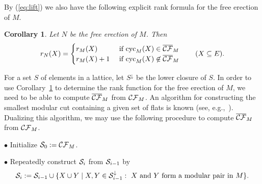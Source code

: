 \documentclass{daj}
\newtheorem{corollary}[thm]{Corollary}\theoremstyle{plain}
\begin{document}
By (\ref{eq:lift}) we also have the following explicit rank formula for the free erection of $M$.
\begin{corollary} \label{cor:free_erection}
Let $N$ be the free erection of $M$.
Then
\begin{equation}
 \label{eq:erection}
r_N(X)=\begin{cases}
r_M(X) & \mbox{ if ${\rm cyc}_M(X)\in \overline{{\cal CF}}_M$} \\
r_M(X)+1 & \mbox{ if ${\rm cyc}_M(X)\not \in \overline{{\cal CF}}_M$}
\end{cases}
\qquad (X\subseteq E).
\end{equation}
\end{corollary}

For a set $S$ of elements in a lattice, let  $S^{\downarrow}$ be the lower closure of $S$.
In order to use Corollary~\ref{cor:free_erection} to determine the rank function for the free erection of $M$, we need to be able to compute $\overline{{\cal CF}}_M$ from ${\cal CF}_M$.
An  algorithm for constructing  the smallest modular cut containing a given set of flats is known (see, e.g.,~\cite[page 367]{D87}).
Dualizing this algorithm, we may use the following procedure  to compute $\overline{{\cal CF}}_M$ from ${\cal CF}_M$.

\medskip


$\bullet$ Initialize ${\cal S}_0:={\cal CF}_M$.

$\bullet$ Repeatedly construct ${\cal S}_i$ from ${\cal S}_{i-1}$ by
\\[-3mm]
\[
{\cal S}_i:={\cal S}_{i-1}\cup \{X\cup Y \mid X, Y\in {\cal S}_{i-1}^{\downarrow}:  \text{ $X$ and $Y$ form a modular pair in $M$} \}.
\]
\\[-9mm]
\end{document}
